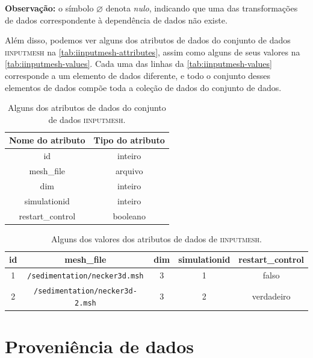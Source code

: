 \textbf{Observação:} o símbolo \( \varnothing \) denota \emph{nulo}, indicando que uma das transformações de dados correspondente à dependência de dados não existe.

Além disso, podemos ver alguns dos atributos de dados do conjunto de dados \textsc{iinputmesh} na \autoref{tab:iinputmesh-attributes}, assim como alguns de seus valores na \autoref{tab:iinputmesh-values}. Cada uma das linhas da \autoref{tab:iinputmesh-values} corresponde a um elemento de dados diferente, e todo o conjunto desses elementos de dados compõe toda a coleção de dados do conjunto de dados.

\begin{table}[htb]
    \centering
    \begin{tabular}{|c|c|}
        \hline
        \textbf{Nome do atributo} & \textbf{Tipo do atributo} \\
        \hline
        id & inteiro \\
        mesh{\_}file & arquivo \\
        dim & inteiro \\
        simulationid & inteiro \\
        restart{\_}control & booleano \\
        \hline
    \end{tabular}
    \caption[Atributos de dados do conjunto de dados \textsc{iinputmesh}]{Alguns dos atributos de dados do conjunto de dados \textsc{iinputmesh}.}%
    \label{tab:iinputmesh-attributes}
\end{table}

\begin{table}[htb]
    \centering
    \begin{tabular}{c|c|c|c|c}
        \textbf{id} & \textbf{mesh{\_}file} & \textbf{dim} & \textbf{simulationid} & \textbf{restart{\_}control} \\
        \hline
        1 & \texttt{/sedimentation/necker3d.msh} & 3 & 1 & \textrm{falso} \\
        2 & \texttt{/sedimentation/necker3d-2.msh} & 3 & 2 & \textrm{verdadeiro} \\
    \end{tabular}
    \caption[Valores dos atributos de dados de \textsc{iinputmesh}]{Alguns dos valores dos atributos de dados de \textsc{iinputmesh}.}%
    \label{tab:iinputmesh-values}
\end{table}

\section{Proveniência de dados}

